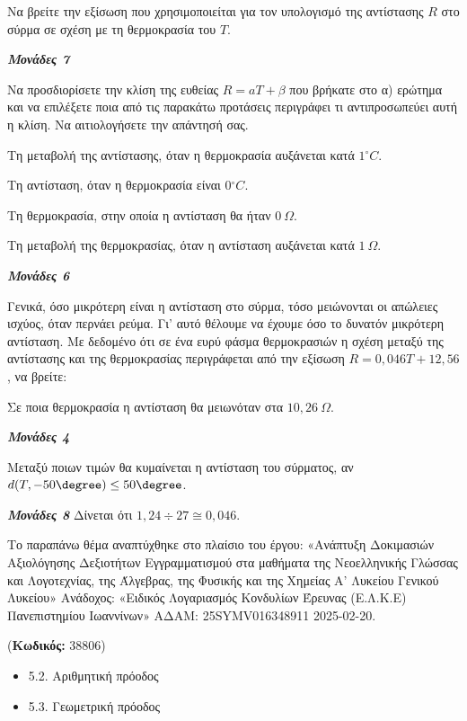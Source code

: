 \documentclass[11pt,a4paper,twoside]{book}
\newcounter{askhsh}[chapter]
\renewcommand{\theaskhsh}{
	\bf{\titlefont{\Large{\thechapter}}.\arabic{askhsh}}
}
\newcommand{\Askhsh}[2]{\refstepcounter{askhsh}{\titlefont{Άσκηση\theaskhsh} - \textcolor{maincolor}{ΘΕΜΑ #2}} ({\small{\textbf{Κωδικός:} #1}})\\}{}
\newenvironment{ylh}{
\begin{tcolorbox}[
breakable,
enhanced standard,
titlerule=0pt,
toprule=0pt, 
rightrule=0pt, 
bottomrule=0pt,
title={\titlefont Ύλη άσκησης},
colback=white,
opacityback=0,
left=2mm,
top=1mm,
bottom=0mm,
boxrule=0pt,
colframe=white,
borderline west={1.5mm}{0pt}{secondarycolor},
leftrule=2mm,
sharp corners,
coltitle=black
]
\begin{itemize}[leftmargin=3mm, itemsep=0mm, label=\textcolor{secondarycolor}{{\small\faBook}}]
}{
\end{itemize}
\end{tcolorbox}
}
\newcommand{\monades}[1]{
\hspace*{\fill}
\textbf{\textit{\textcolor{maincolor}{Μονάδες #1}}}}
\begin{document}
\begin{alist}
\item Να βρείτε την εξίσωση που χρησιμοποιείται για τον υπολογισμό της αντίστασης $R$ στο σύρμα σε σχέση με τη θερμοκρασία του $T$.
\monades{7}
\item Να προσδιορίσετε την κλίση της ευθείας $R = a T + \beta$ που βρήκατε στο α) ερώτημα και να επιλέξετε ποια από τις παρακάτω προτάσεις περιγράφει τι αντιπροσωπεύει αυτή η κλίση. Να αιτιολογήσετε την απάντησή σας.

\begin{rlist}
\item Τη μεταβολή της αντίστασης, όταν η θερμοκρασία αυξάνεται κατά $1{^\circ}C$.

\item Τη αντίσταση, όταν η θερμοκρασία είναι $0{^\circ}C$.

\item Τη θερμοκρασία, στην οποία η αντίσταση θα ήταν $0\ \Omega$.

\item Τη μεταβολή της θερμοκρασίας, όταν η αντίσταση αυξάνεται κατά $1\ \Omega$.
\monades{6}
\end{rlist}
\item Γενικά, όσο μικρότερη είναι η αντίσταση στο σύρμα, τόσο μειώνονται οι απώλειες ισχύος, όταν περνάει ρεύμα. Γι' αυτό θέλουμε να έχουμε όσο το δυνατόν μικρότερη αντίσταση. Με δεδομένο ότι σε ένα ευρύ φάσμα θερμοκρασιών η σχέση μεταξύ της αντίστασης και της θερμοκρασίας περιγράφεται από την εξίσωση $R = 0,046T + 12,56$, να βρείτε:

\begin{rlist}
\item Σε ποια θερμοκρασία η αντίσταση θα μειωνόταν στα $10,26\ \Omega$.
\monades{4}
\item Μεταξύ ποιων τιμών θα κυμαίνεται η αντίσταση του σύρματος, αν $d(T, - 50\degree) \leq 50\degree$.
\monades{8}
Δίνεται ότι $1,24 \div 27 \cong 0,046$.

{\footnotesize Το παραπάνω θέμα αναπτύχθηκε στο πλαίσιο του έργου: «Ανάπτυξη Δοκιμασιών Αξιολόγησης Δεξιοτήτων Εγγραμματισμού στα μαθήματα της Νεοελληνικής Γλώσσας και Λογοτεχνίας, της Άλγεβρας, της Φυσικής και της Χημείας Α' Λυκείου Γενικού Λυκείου» Ανάδοχος: «Ειδικός Λογαριασμός Κονδυλίων Έρευνας (Ε.Λ.Κ.Ε) Πανεπιστημίου Ιωαννίνων» ΑΔΑΜ: 25SYMV016348911 2025-02-20.}
\end{rlist}
\end{alist}

\vspace{4mm}
\Askhsh{38806}{4}
\begin{ylh}
    \item 5.2. Αριθμητική πρόοδος
    \item 5.3. Γεωμετρική πρόοδος
\end{ylh}
\end{document}

